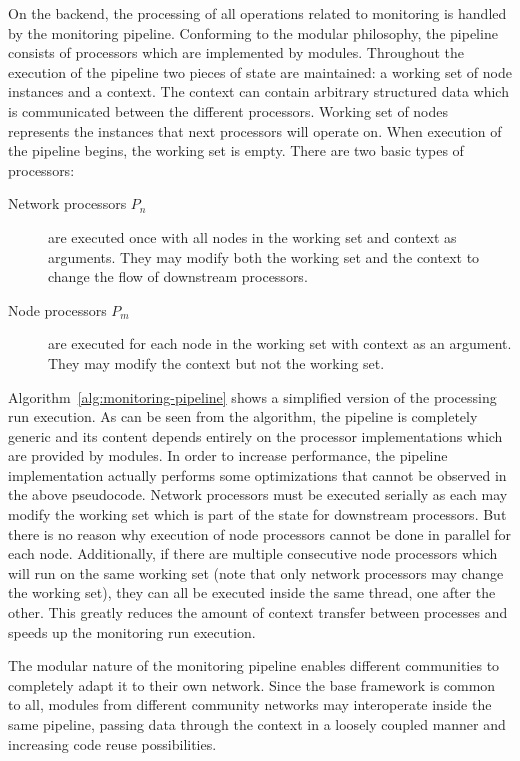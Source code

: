 \documentclass[5p,sort&compress]{elsarticle}
\begin{document}
On the backend, the processing of all operations related to monitoring is handled by the monitoring pipeline.
Conforming to the modular philosophy, the pipeline consists of processors which are implemented by modules.
Throughout the execution of the pipeline two pieces of state are maintained: a working set of node instances and a context.
The context can contain arbitrary structured data which is communicated between the different processors.
Working set of nodes represents the instances that next processors will operate on.
When execution of the pipeline begins, the working set is empty.
There are two basic types of processors:
\begin{description}
\item[Network processors $P_n$] are executed once with all nodes in the working set and context as arguments. They may modify both the working set and the context to change the flow of downstream processors.

\item[Node processors $P_m$] are executed for each node in the working set with context as an argument. They may modify the context but not the working set.
\end{description}

Algorithm~\ref{alg:monitoring-pipeline} shows a simplified version of the processing run execution.
As can be seen from the algorithm, the pipeline is completely generic and its content depends entirely on the processor implementations which are provided by modules.
In order to increase performance, the pipeline implementation actually performs some optimizations that cannot be observed in the above pseudocode.
Network processors must be executed serially as each may modify the working set which is part of the state for downstream processors.
But there is no reason why execution of node processors cannot be done in parallel for each node.
Additionally, if there are multiple consecutive node processors which will run on the same working set (note that only network processors may change the working set), they can all be executed inside the same thread, one after the other.
This greatly reduces the amount of context transfer between processes and speeds up the monitoring run execution.

The modular nature of the monitoring pipeline enables different communities to completely adapt it to their own network.
Since the base framework is common to all, modules from different community networks may interoperate inside the same pipeline, passing data through the context in a loosely coupled manner and increasing code reuse possibilities.
\end{document}
